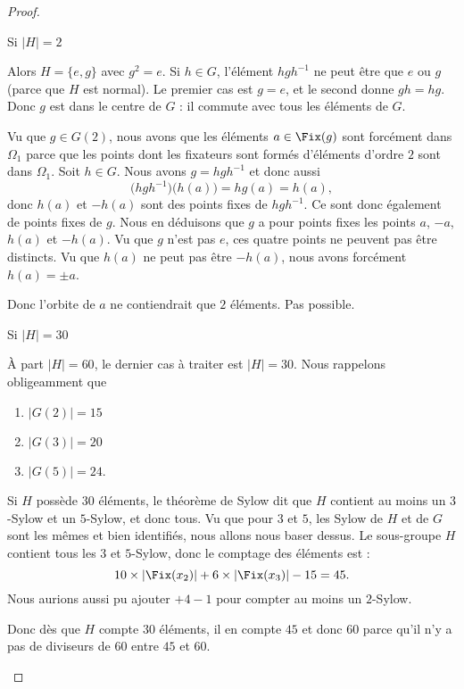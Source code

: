 \begin{proof}
\begin{subproof}
            \item[Si \( | H |=2\)]

                Alors \( H=\{ e,g \}\) avec \( g^2=e\). Si \( h\in G\), l'élément \( hgh^{-1}\) ne peut être que \( e\) ou \( g\) (parce que \( H\) est normal). Le premier cas est \( g=e\), et le second donne \( gh=hg\). Donc \( g\) est dans le centre de \( G\) : il commute avec tous les éléments de \( G\).

                Vu que \( g\in G(2)\), nous avons que les éléments \( a\in\Fix(g)\) sont forcément dans \( \Omega_1\) parce que les points dont les fixateurs sont formés d'éléments d'ordre \( 2\) sont dans \( \Omega_1\). Soit \( h\in G\). Nous avons \( g=hgh^{-1}\) et donc aussi
                \begin{equation}
                    \big( hgh^{-1} \big)\big( h(a) \big)=hg(a)=h(a),
                \end{equation}
                donc \( h(a)\) et \( -h(a)\) sont des points fixes de \( hgh^{-1}\). Ce sont donc également de points fixes de \( g\). Nous en déduisons que \( g\) a pour points fixes les points \( a\), \( -a\), \( h(a)\) et \( -h(a)\). Vu que \( g\) n'est pas \( e\), ces quatre points ne peuvent pas être distincts. Vu que \( h(a)\) ne peut pas être \( -h(a)\), nous avons forcément \( h(a)=\pm a\).

                Donc l'orbite de \( a\) ne contiendrait que \( 2\) éléments. Pas possible.

            \item[Si \( | H |=30\)]

               À part \( | H |=60\), le dernier cas à traiter est \( | H |=30\). Nous rappelons obligeamment que
               \begin{enumerate}
                   \item
                       \( | G(2) |=15\)
                   \item
                       \( | G(3) |=20\)
                   \item
                       \( | G(5) |=24\).
               \end{enumerate}
               Si \( H\) possède \( 30\) éléments, le théorème de Sylow dit que \( H\) contient au moins un \( 3\)-Sylow et un \( 5\)-Sylow, et donc tous. Vu que pour \( 3\) et \( 5\), les Sylow de \( H\) et de \( G\) sont les mêmes et bien identifiés, nous allons nous baser dessus. Le sous-groupe \( H\) contient tous les \( 3\) et \( 5\)-Sylow, donc le comptage des éléments est :
                \begin{equation}
                    10\times | \Fix(x_2) |+6\times | \Fix(x_3) |-15=45.
                \end{equation}
                Nous aurions aussi pu ajouter \( +4-1\) pour compter au moins un \( 2\)-Sylow.

                Donc dès que \( H\) compte \( 30\) éléments, il en compte \( 45\) et donc \( 60\) parce qu'il n'y a pas de diviseurs de \( 60\) entre \( 45\) et \( 60\).

    \end{subproof}

\end{proof}

